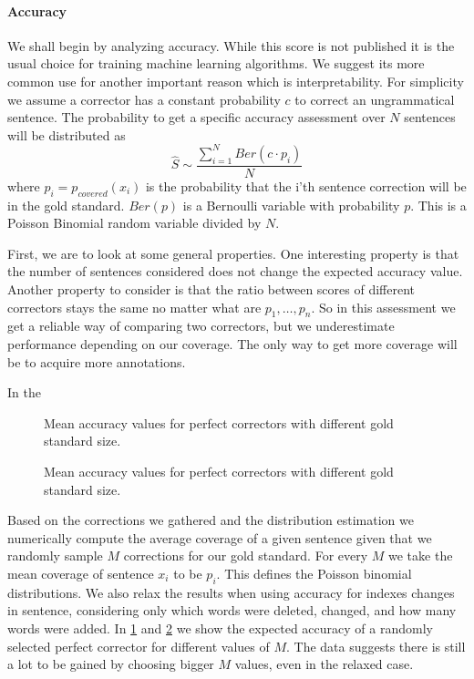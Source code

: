 \documentclass[english]{article}
\begin{document}
\paragraph{Accuracy}We shall begin by analyzing accuracy. While this score is not published it is the usual choice for training machine learning algorithms. We suggest its more common use for another important reason which is interpretability.
For simplicity we assume a corrector has a constant probability $c$ to correct an ungrammatical sentence. The probability to get a specific accuracy assessment over $N$ sentences will be distributed as $$\hat{S}\sim\frac{\sum_{i=1}^{N}Ber\left(c\cdot p_i\right)}{N} $$ 
where $p_i=p_{covered}\left(x_i\right) $ is the probability that the i'th sentence correction will be in the gold standard. 
$Ber\left(p\right)$ is a Bernoulli variable with probability $p$. This is a Poisson Binomial random variable divided by $N$. 

First, we are to look at some general properties.
 One interesting property is that the number of sentences considered does not change the expected accuracy value.
 Another property to consider is that the ratio between scores of different correctors stays the same no matter what are $p_1,\ldots,p_n$. So in this assessment we get a reliable way of comparing two correctors, but we underestimate performance depending on our coverage. The only way to get more coverage will be to acquire more annotations.
 
 In the
 
 \begin{figure}
 	\caption{Mean accuracy values for perfect correctors with different gold standard size.}
 	\label{fig:accuracy_vals}
 \end{figure}
  \begin{figure}
  	\caption{Mean accuracy values for perfect correctors with different gold standard size.}
  	\label{fig:accuracy_vals_ind}
  \end{figure}
 
 Based on the corrections we gathered and the distribution estimation we numerically compute the average coverage of a given sentence given that we randomly sample $M$ corrections for our gold standard. For every $M$ we take the mean coverage of sentence $x_i$ to be $p_i$. This defines the Poisson binomial distributions. We also relax the results when using accuracy for indexes changes in sentence, considering only which words were deleted, changed, and how many words were added. In \ref{fig:accuracy_vals} and \ref{fig:accuracy_vals_ind} we show the expected accuracy of a randomly selected perfect corrector for different values of $M$. The data suggests there is still a lot to be gained by choosing bigger $M$ values, even in the relaxed case.
 
\end{document}
